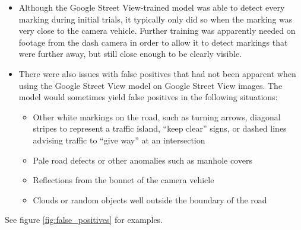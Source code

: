 \documentclass[11pt,twoside]{report}
\begin{document}
\begin{itemize}
\item{Although the Google Street View-trained model was able to detect every marking during initial trials, it typically only did so when the marking was very close to the camera vehicle.  Further training was apparently needed on footage from the dash camera in order to allow it to detect markings that were further away, but still close enough to be clearly visible.}
\item{There were also issues with false positives that had not been apparent when using the Google Street View model on Google Street View images.  The model would sometimes yield false positives in the following situations:

	\begin{itemize}
	\item{Other white markings on the road, such as turning arrows, diagonal stripes to represent a traffic island, ``keep clear'' signs, or dashed lines advising traffic to ``give way'' at an intersection}
	\item{Pale road defects or other anomalies such as manhole covers}
	\item{Reflections from the bonnet of the camera vehicle}
	\item{Clouds or random objects well outside the boundary of the road}
	\end{itemize}
}
\end{itemize}

See figure \ref{fig:false_positives} for examples.
\end{document}

